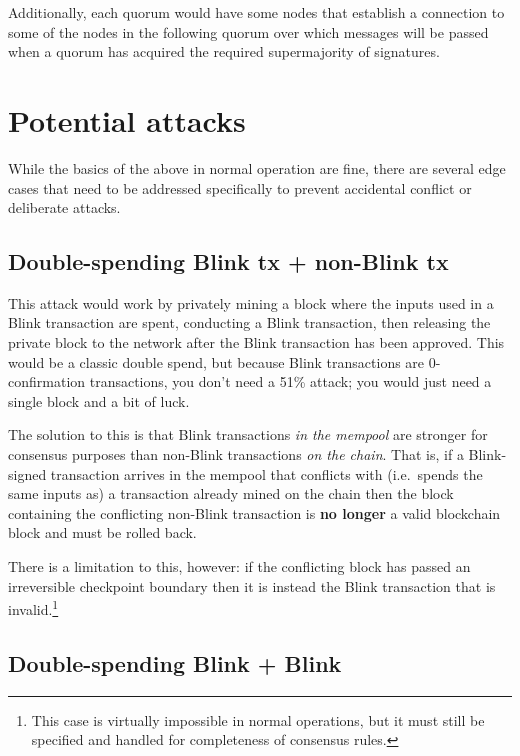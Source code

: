 Additionally, each quorum would have some nodes that establish a
connection to some of the nodes in the following quorum over which
messages will be passed when a quorum has acquired the required
supermajority of signatures.

\hypertarget{potential-attacks}{%
\section{Potential attacks}\label{potential-attacks}}

While the basics of the above in normal operation are fine, there are
several edge cases that need to be addressed specifically to prevent
accidental conflict or deliberate attacks.

\hypertarget{double-spending-blink-tx-non-blink-tx}{%
\subsection{Double-spending Blink tx + non-Blink
tx}\label{double-spending-blink-tx-non-blink-tx}}

This attack would work by privately mining a block where the inputs used
in a Blink transaction are spent, conducting a Blink transaction, then
releasing the private block to the network after the Blink transaction
has been approved. This would be a classic double spend, but because
Blink transactions are 0-confirmation transactions, you don't need a
51\% attack; you would just need a single block and a bit of luck.

The solution to this is that Blink transactions \emph{in the mempool}
are stronger for consensus purposes than non-Blink transactions \emph{on
the chain}. That is, if a Blink-signed transaction arrives in the
mempool that conflicts with (i.e.~spends the same inputs as) a
transaction already mined on the chain then the block containing the
conflicting non-Blink transaction is \textbf{no longer} a valid
blockchain block and must be rolled back.

There is a limitation to this, however: if the conflicting block has
passed an irreversible checkpoint boundary then it is instead the Blink
transaction that is invalid.\footnote{This case is virtually impossible
  in normal operations, but it must still be specified and handled for
  completeness of consensus rules.}

\hypertarget{double-spending-blink-blink}{%
\subsection{Double-spending Blink +
Blink}\label{double-spending-blink-blink}}

